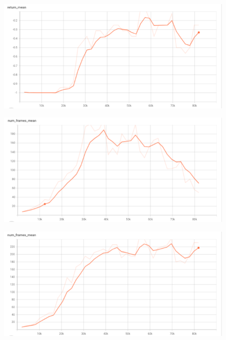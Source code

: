 \begin{figure}
\begin{minipage}{.5\textwidth}
        \label{fig:returndio}
      \end{minipage}%
      \begin{minipage}{.5\textwidth}
        \centering
        \includegraphics[width=1\linewidth]{figures/rlreturn.png}
        \label{fig:returnrl}
      \end{minipage}
%
      \centering
      \begin{minipage}{.5\textwidth}
        \centering
        \includegraphics[width=1\linewidth]{figures/dioframesmean.png}
        \label{fig:framesdio}
      \end{minipage}%
      \begin{minipage}{.5\textwidth}
        \centering
        \includegraphics[width=1\linewidth]{figures/rlframesmean.png}
        \label{fig:framesrl}
      \end{minipage}
    \end{figure}

